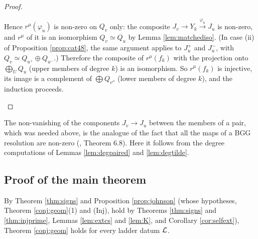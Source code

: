 \documentclass[a4paper,12pt,leqno]{amsart}
\theoremstyle{plain}
\theoremstyle{definition}
\begin{document}
\begin{proof}
\begin{itemize}
\begin{itemize}
\end{itemize}
Hence $r^\mu(\varphi_u)$ is non-zero on $Q_v$ only: the composite $J_v\to Y_k\xrightarrow{\varphi_u}
J_u$ is non-zero, and $r^\mu$ of it is an isomorphism $Q_v\simeq Q_u$ by Lemma \ref{lem:matchediso}.
(In case (ii) of Proposition \ref{prop:cat48}, the same argument applies to $J_u^+$ and $J_u^-$, with $Q_v\simeq Q_{u^+}\oplus
Q_{u^-}$.) Therefore the composite of $r^\mu(f_k)$ with the projection onto $\bigoplus_UQ_u$ (upper
members of degree $k$) is an isomorphism. So $r^\mu(f_k)$ is injective, its image is a complement of
$\bigoplus Q_{v''}$ (lower members of degree $k$), and the induction proceeds.
\end{itemize}
\end{proof}

\noindent The non-vanishing of the components $J_v\to J_u$ between the members of a pair, which was
needed above, is the analogue of the fact that all the maps of a BGG resolution are non-zero
(\cite{Hum08}, Theorem 6.8). Here it follows from the degree computations of Lemmas
\ref{lem:degpaired} and \ref{lem:degtilde}.

\subsection{Proof of the main theorem}
By Theorem \ref{thm:signs} and Proposition \ref{prop:johnson} (whose hypotheses, Theorem
\ref{conj:geom}(1) and (Inj), hold by Theorems \ref{thm:signs} and \ref{thm:injprime}, Lemmas
\ref{lem:extcs} and \ref{lem:K}, and Corollary \ref{cor:selfext}), Theorem \ref{conj:geom} holds for every
ladder datum $\mathcal{L}$.
\end{document}
